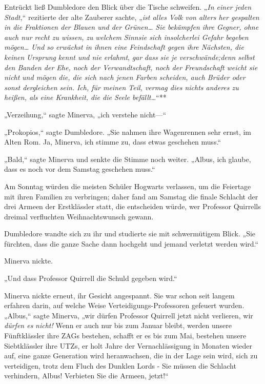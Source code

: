 {Entrückt ließ Dumbledore den Blick über die Tische schweifen. „\emph{In einer jeden Stadt,}“ rezitierte der alte Zauberer sachte, „\emph{ist alles Volk von alters her gespalten in die Fraktionen der Blauen und der Grünen… Sie bekämpfen ihre Gegner, ohne auch nur recht zu wissen,} \emph{zu} \emph{welchem} \emph{Sinnsie sich insolcherlei Gefahr} \emph{begeben} \emph{mögen…} \emph{Und so} \emph{erwächst in ihnen eine Feindschaft gegen ihre Nächsten, die keinen} \emph{Ursprung} \emph{kennt und nie} \emph{erlahmt}, \emph{gar} \emph{dass sie je verschwände;denn} \emph{selbst den Banden der Ehe, noch der Verwandtschaft, noch der Freundschaft} \emph{weicht sie nicht} \emph{und mögen die, die sich nach jenen Farben scheiden, auch Brüder oder sonst dergleichen sein.} \emph{Ich, für meinen Teil, vermag dies nichts anderes zu heißen, als eine Krankheit, die die Seele befällt…}“**

„Verzeihung,“ sagte Minerva, „ich verstehe nicht—“

„Prokopios,“ sagte Dumbledore. „Sie nahmen ihre Wagenrennen sehr ernst, im Alten Rom. Ja, Minerva, ich stimme zu, dass etwas geschehen muss.“

„Bald,“ sagte Minerva und senkte die Stimme noch weiter. „Albus, ich glaube, dass es noch vor dem Samstag geschehen muss.“

Am Sonntag würden die meisten Schüler Hogwarts verlassen, um die Feiertage mit ihren Familien zu verbringen; daher fand am Samstag die finale Schlacht der drei Armeen der Erstklässler statt, die entscheiden würde, wer Professor Quirrells dreimal verfluchten Weihnachtswunsch gewann.

Dumbledore wandte sich zu ihr und studierte sie mit schwermütigem Blick. „Sie fürchten, dass die ganze Sache dann hochgeht und jemand verletzt werden wird.“

Minerva nickte.

„Und dass Professor Quirrell die Schuld gegeben wird.“

Minerva nickte erneut, ihr Gesicht angespannt. Sie war schon seit langem erfahren darin, auf welche Weise Verteidigungs-Professoren gefeuert wurden. „Albus,“ sagte Minerva, „wir dürfen Professor Quirrell jetzt nicht verlieren, wir \emph{dürfen es} \emph{nicht!} Wenn er auch nur bis zum Januar bleibt, werden unsere Fünftklässler ihre ZAGs bestehen, schafft er es bis zum Mai, bestehen unsere Siebtklässler ihre UTZs, er holt Jahre der Vernachlässigung in Monaten wieder auf, eine ganze Generation wird heranwachsen, die in der Lage sein wird, sich zu verteidigen, trotz dem Fluch des Dunklen Lords - Sie müssen die Schlacht verhindern, Albus! Verbieten Sie die Armeen, jetzt!“

}
